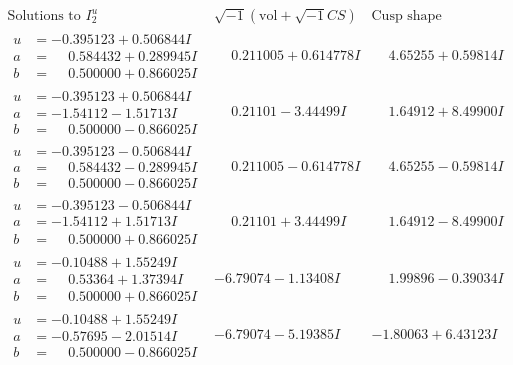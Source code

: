 \documentclass[1p]{elsarticle_modified}
\theoremstyle{definition}
\newcommand{\I}{\sqrt{-1}}
\begin{document}
$$\begin{array}{c|c|c}  
\text{Solutions to }I^u_{2}& \I (\text{vol} + \sqrt{-1}CS) & \text{Cusp shape}\\
 \hline 
\begin{aligned}
u &= -0.395123 + 0.506844 I \\
a &= \phantom{-}0.584432 + 0.289945 I \\
b &= \phantom{-}0.500000 + 0.866025 I\end{aligned}
 & \phantom{-}0.211005 + 0.614778 I & \phantom{-}4.65255 + 0.59814 I \\ \hline\begin{aligned}
u &= -0.395123 + 0.506844 I \\
a &= -1.54112 - 1.51713 I \\
b &= \phantom{-}0.500000 - 0.866025 I\end{aligned}
 & \phantom{-}0.21101 - 3.44499 I & \phantom{-}1.64912 + 8.49900 I \\ \hline\begin{aligned}
u &= -0.395123 - 0.506844 I \\
a &= \phantom{-}0.584432 - 0.289945 I \\
b &= \phantom{-}0.500000 - 0.866025 I\end{aligned}
 & \phantom{-}0.211005 - 0.614778 I & \phantom{-}4.65255 - 0.59814 I \\ \hline\begin{aligned}
u &= -0.395123 - 0.506844 I \\
a &= -1.54112 + 1.51713 I \\
b &= \phantom{-}0.500000 + 0.866025 I\end{aligned}
 & \phantom{-}0.21101 + 3.44499 I & \phantom{-}1.64912 - 8.49900 I \\ \hline\begin{aligned}
u &= -0.10488 + 1.55249 I \\
a &= \phantom{-}0.53364 + 1.37394 I \\
b &= \phantom{-}0.500000 + 0.866025 I\end{aligned}
 & -6.79074 - 1.13408 I & \phantom{-}1.99896 - 0.39034 I \\ \hline\begin{aligned}
u &= -0.10488 + 1.55249 I \\
a &= -0.57695 - 2.01514 I \\
b &= \phantom{-}0.500000 - 0.866025 I\end{aligned}
 & -6.79074 - 5.19385 I & -1.80063 + 6.43123 I \\ \hline\begin{aligned}

\end{aligned}
\end{array}$$
\end{document}
